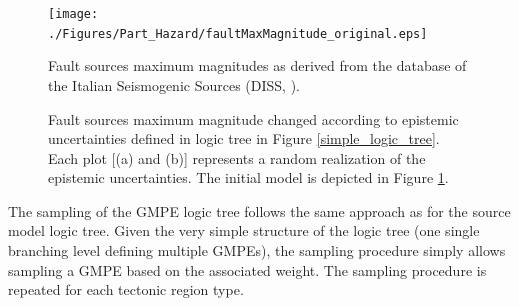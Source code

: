 \begin{figure}[!htbp]
\begin{center}
\texttt{[image: ./Figures/Part\_Hazard/faultMaxMagnitude\_original.eps]}
\caption{Fault sources maximum magnitudes as derived from the database of the Italian Seismogenic Sources (DISS, \cite{basili2008}).}
\label{original_model}
\end{center}
\end{figure}
\begin{figure}[!htbp]
\begin{center}
\caption{Fault sources maximum magnitude changed according to epistemic uncertainties defined in logic tree in Figure \ref{simple_logic_tree}. Each plot [(a) and (b)] represents a random realization of the epistemic uncertainties. The initial model is depicted in Figure \ref{original_model}.}
\label{max_magnitude_uncertainties}
\end{center}
\end{figure}
The sampling of the GMPE logic tree follows the same approach as for the source model logic tree. Given the very simple structure of the logic tree (one single branching level defining multiple GMPEs), the sampling procedure simply allows sampling a GMPE based on the associated weight. The sampling procedure is repeated for each tectonic region type.
